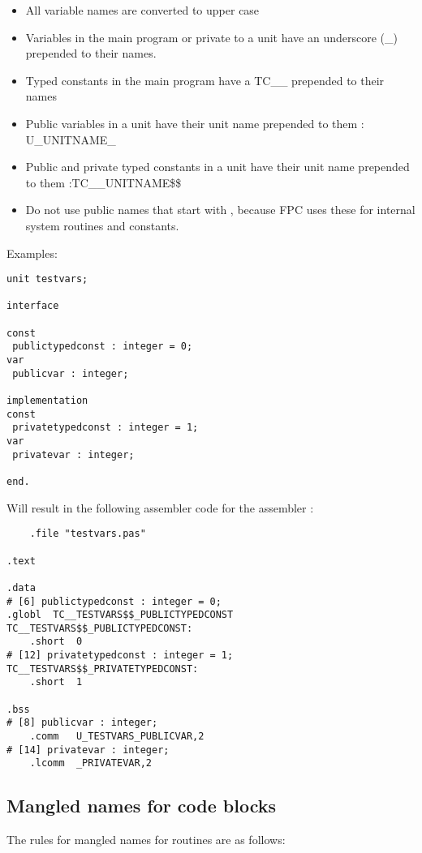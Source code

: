\begin{itemize}
\item All variable names are converted to upper case
\item Variables in the main program or private to a unit have an underscore
(\_) prepended to their names.
\item Typed constants in the main program have a TC\_\_ prepended to their names
\item Public variables in a unit have their unit name prepended to them : U\_UNITNAME\_
\item Public and private typed constants in a unit have their unit name prepended to them :TC\_\_UNITNAME\$\$
\item Do not use public names that start with , because FPC uses these for internal system routines and constants.
\end{itemize}
Examples:
\begin{verbatim}
unit testvars;

interface

const
 publictypedconst : integer = 0;
var
 publicvar : integer;

implementation
const
 privatetypedconst : integer = 1;
var
 privatevar : integer;

end.
\end{verbatim}
Will result in the following assembler code for the \gnu assembler :
\begin{verbatim}
	.file "testvars.pas"

.text

.data
# [6] publictypedconst : integer = 0;
.globl	TC__TESTVARS$$_PUBLICTYPEDCONST
TC__TESTVARS$$_PUBLICTYPEDCONST:
	.short	0
# [12] privatetypedconst : integer = 1;
TC__TESTVARS$$_PRIVATETYPEDCONST:
	.short	1

.bss
# [8] publicvar : integer;
	.comm	U_TESTVARS_PUBLICVAR,2
# [14] privatevar : integer;
	.lcomm	_PRIVATEVAR,2
\end{verbatim}


\subsection{Mangled names for code blocks}

The rules for mangled names for routines are as follows:

